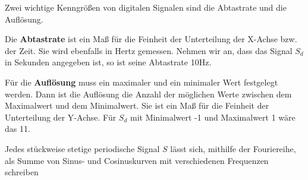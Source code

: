 Zwei wichtige Kenngrößen von digitalen Signalen sind die Abtastrate
und die Auflösung.

Die \textbf{Abtastrate} ist ein Maß für die Feinheit der Unterteilung der X-Achse
bzw. der Zeit. Sie wird ebenfalls in Hertz gemessen. Nehmen wir an, dass
das Signal $S_d$ in Sekunden angegeben ist, so ist seine Abtastrate 10Hz.


Für die \textbf{Auflösung} muss ein maximaler und ein minimaler Wert festgelegt werden.
Dann ist die Auflösung die Anzahl der möglichen Werte zwischen dem
Maximalwert und dem Minimalwert. Sie ist ein Maß für die Feinheit der Unterteilung
der Y-Achse.
Für $S_d$ mit Minimalwert -1 und Maximalwert 1
wäre das 11.

Jedes stückweise stetige periodische Signal $S$ lässt sich, mithilfe der Fouriereihe,
als Summe von Sinus- und Cosinuskurven mit verschiedenen Frequenzen schreiben
\cite[2.2.1]{grueningen2008dsv}

